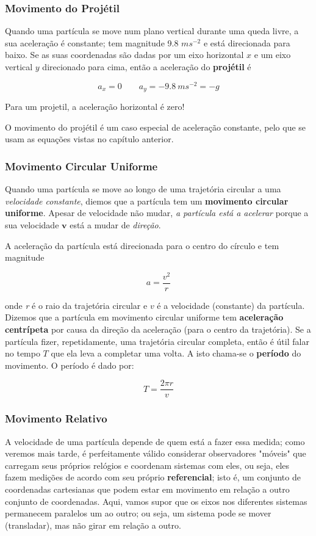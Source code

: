 \subsubsection{Movimento do Projétil}

Quando uma partícula se move num plano vertical durante uma queda livre, a sua aceleração é constante; tem magnitude 9.8 $ms^{-2}$ e está direcionada para baixo. Se as suas coordenadas são dadas por um eixo horizontal $x$ e um eixo vertical $y$ direcionado para cima, então a aceleração do \textbf{projétil} é

\begin{equation}
    a_x=0 \qquad a_y=-9.8\ ms^{-2}=-g
\end{equation}

Para um projetil, a aceleração horizontal é zero!

O movimento do projétil é um caso especial de aceleração constante, pelo que se usam as equações vistas no capítulo anterior.

\subsubsection{Movimento Circular Uniforme}
Quando uma partícula se move ao longo de uma trajetória circular a uma \emph{velocidade constante}, diemos que a partícula tem um \textbf{movimento circular uniforme}. Apesar de velocidade não mudar, \emph{a partícula está a acelerar} porque a sua velocidade $\mathbf{v}$ está a mudar de \emph{direção}.

A aceleração da partícula está direcionada para o centro do círculo e tem magnitude

\begin{equation}
    a=\frac{v^2}{r}
\end{equation}

onde \emph{r} é o raio da trajetória circular e $v$ é a velocidade (constante) da partícula. Dizemos que a partícula em movimento circular uniforme tem \textbf{aceleração centrípeta} por causa da direção da aceleração (para o centro da trajetória).
Se a partícula fizer, repetidamente, uma trajetória circular completa, então é útil falar no tempo $T$ que ela leva a completar uma volta. A isto chama-se o \textbf{período} do movimento. O período é dado por:

\begin{equation}
    T=\frac{2\pi r}{v}
\end{equation}

\subsubsection{Movimento Relativo}
A velocidade de uma partícula depende de quem está a fazer essa medida; como veremos mais tarde, é perfeitamente válido considerar observadores "móveis" que carregam seus próprios relógios e coordenam sistemas com eles, ou seja, eles fazem medições de acordo com seu próprio \textbf{referencial}; isto é, um conjunto de coordenadas cartesianas que podem estar em movimento em relação a outro conjunto de coordenadas. Aqui, vamos supor que os eixos nos diferentes sistemas permanecem paralelos um ao outro; ou seja, um sistema pode se mover (transladar), mas não girar em relação a outro.

